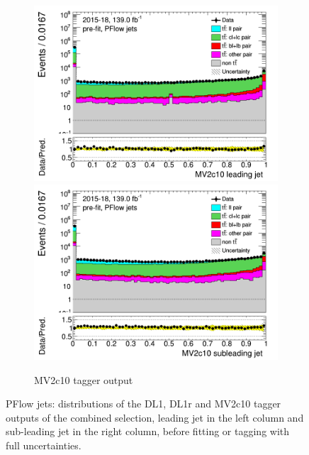 \documentclass[letterpaper,12pt]{article}
\begin{document}
\begin{figure}[H]
\begin{subfigure}[t]{1\linewidth}
	\end{subfigure}
	\begin{subfigure}[t]{1\linewidth}
	\includegraphics[width=.45\textwidth]{FTAG_plots/pretagNoRwwithhighpTPFlowall/DataMC_h_J0_MV2c10_log.png}
	\includegraphics[width=.45\textwidth]{FTAG_plots/pretagNoRwwithhighpTPFlowall/DataMC_h_J1_MV2c10_log.png}\\
	\caption{MV2c10 tagger output}
	\end{subfigure}
	\caption{PFlow jets: distributions of the DL1, DL1r and MV2c10 
	tagger outputs of the combined selection, 
	leading jet in the left column and sub-leading jet in the right column,
	before fitting or tagging with full uncertainties.} \label{fig:taggers_PFlow}
\end{figure}
\newpage
\end{document}
